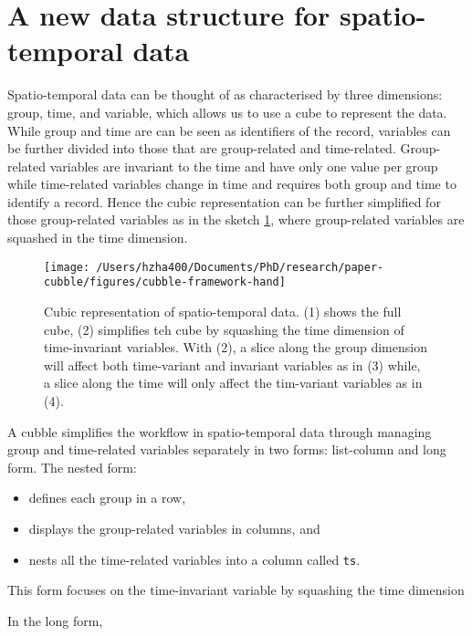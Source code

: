 \documentclass{article}
\begin{document}
\hypertarget{a-new-data-structure-for-spatio-temporal-data}{%
\section{A new data structure for spatio-temporal
data}\label{a-new-data-structure-for-spatio-temporal-data}}

Spatio-temporal data can be thought of as characterised by three
dimensions: group, time, and variable, which allows us to use a cube to
represent the data. While group and time are can be seen as identifiers
of the record, variables can be further divided into those that are
group-related and time-related. Group-related variables are invariant to
the time and have only one value per group while time-related variables
change in time and requires both group and time to identify a record.
Hence the cubic representation can be further simplified for those
group-related variables as in the sketch \ref{fig:framework}, where
group-related variables are squashed in the time dimension.

\begin{figure}
\texttt{[image: /Users/hzha400/Documents/PhD/research/paper-cubble/figures/cubble-framework-hand]} \caption{Cubic representation of spatio-temporal data. (1) shows the full cube, (2) simplifies teh cube by squashing the time dimension of time-invariant variables. With (2), a slice along the group dimension will affect both time-variant and invariant variables as in (3) while, a slice along the time will only affect the tim-variant variables as in (4).}\label{fig:framework}
\end{figure}

A cubble simplifies the workflow in spatio-temporal data through
managing group and time-related variables separately in two forms:
list-column and long form. The nested form:

\begin{itemize}
\tightlist
\item
  defines each group in a row,
\item
  displays the group-related variables in columns, and
\item
  nests all the time-related variables into a column called \texttt{ts}.
\end{itemize}

This form focuses on the time-invariant variable by squashing the time
dimension

In the long form,
\end{document}
